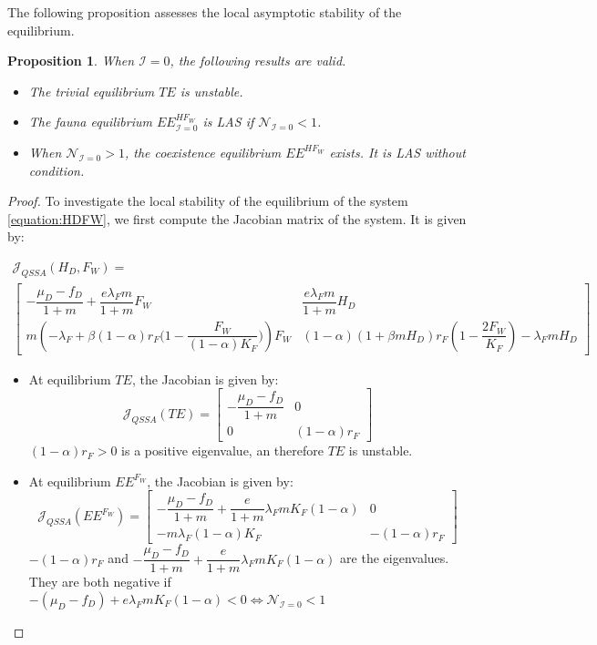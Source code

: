 \documentclass{article}
\newcommand{\lfw}{\lambda_{F}}
\newcommand{\lfw}{\lambda_{F}}
\newcommand{\cI}{\mathcal{I}}
\newtheorem{prop}{Proposition}
\begin{document}
The following proposition assesses the local asymptotic stability of the equilibrium.

\begin{prop}\label{prop:stab 2D, cI=0}
When $\cI =0$, the following results are valid.
\begin{itemize}
\item The trivial equilibrium $TE$ is unstable.
\item The fauna equilibrium $EE^{HF_W}_{\cI = 0}$ is LAS if $\mathcal{N}_{\cI = 0} < 1$.
\item When $\mathcal{N}_{\cI = 0} > 1$, the coexistence equilibrium $EE^{HF_W}$ exists. It is LAS without condition.
\end{itemize}
\end{prop}

\begin{proof}
To investigate the local stability of the equilibrium of the system \eqref{equation:HDFW}, we first compute the Jacobian matrix of the system. It is given by:

\begin{multline}
\mathcal{J}_{QSSA}(H_D, F_W) = \\ \begin{bmatrix}
- \dfrac{\mu_D - f_D}{1+m} + \dfrac{e \lfw m}{1+m}  F_W & \dfrac{e \lfw m}{1+m}  H_D \\
m\left(-\lfw + \beta (1-\alpha) r_F \Big(1- \dfrac{F_W}{(1-\alpha)K_F} \Big) \right) F_W & (1-\alpha) (1+\beta m H_D) r_F \left(1 - \dfrac{2F_W}{K_F} \right) - \lfw m H_D
\end{bmatrix}
\label{equation:Jqssa}
\end{multline}

\begin{itemize}
\item At equilibrium $TE$, the Jacobian is given by:
\begin{equation*}
\mathcal{J}_{QSSA}(TE) = \begin{bmatrix}
- \dfrac{\mu_D - f_D}{1+m} &0 \\
0 & (1-\alpha)  r_F 
\end{bmatrix}
\end{equation*}
$(1-\alpha) r_F > 0$ is a positive eigenvalue, an therefore $TE$ is unstable.

\item At equilibrium $EE^{F_W}$, the Jacobian is given by: 
\begin{equation*}
\mathcal{J}_{QSSA}(EE^{F_W}) = \begin{bmatrix}
- \dfrac{\mu_D - f_D}{1+m} + \dfrac{e}{1+m}\lfw m K_F(1-\alpha) &0 \\
- m \lfw (1-\alpha)K_F & -(1-\alpha)  r_F 
\end{bmatrix}
\end{equation*}
$-(1-\alpha)  r_F$ and $- \dfrac{\mu_D - f_D}{1+m} + \dfrac{e}{1+m}\lfw m K_F(1-\alpha)$ are the eigenvalues. They are both negative if $-(\mu_D - f_D) + e\lfw m K_F(1-\alpha) <0 \Leftrightarrow \mathcal{N}_{\cI = 0} < 1$


\end{itemize}
\end{proof}
\end{document}
